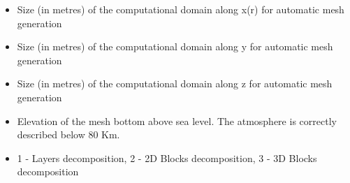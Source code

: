 \begin{itemize}
\item
{}
{Size (in metres) of the computational domain along x(r) for automatic mesh generation}

\item
{}
{Size (in metres) of the computational domain along y for automatic mesh generation}

\item
{}
{Size (in metres) of the computational domain along z for automatic mesh generation}

\item
{}
{Elevation of the mesh bottom above sea level. The atmosphere is correctly
described below 80 Km.}

\item
{}
{1 - Layers decomposition, 2 - 2D Blocks decomposition, 3 - 3D Blocks decomposition}

\end{itemize}

